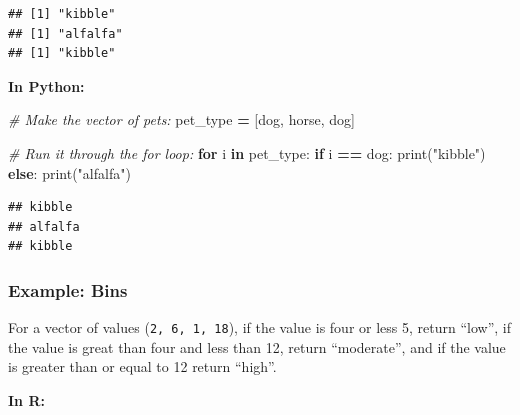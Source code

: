 \documentclass[
]{book}
\newenvironment{Shaded}{\begin{snugshade}}{\end{snugshade}}
\newcommand{\BuiltInTok}[1]{#1}
\newcommand{\CommentTok}[1]{\textcolor[rgb]{0.56,0.35,0.01}{\textit{#1}}}
\newcommand{\ControlFlowTok}[1]{\textcolor[rgb]{0.13,0.29,0.53}{\textbf{#1}}}
\newcommand{\KeywordTok}[1]{\textcolor[rgb]{0.13,0.29,0.53}{\textbf{#1}}}
\newcommand{\NormalTok}[1]{#1}
\newcommand{\OperatorTok}[1]{\textcolor[rgb]{0.81,0.36,0.00}{\textbf{#1}}}
\newcommand{\StringTok}[1]{\textcolor[rgb]{0.31,0.60,0.02}{#1}}
\begin{document}
\begin{verbatim}
## [1] "kibble"
## [1] "alfalfa"
## [1] "kibble"
\end{verbatim}

\textbf{In Python:}

\begin{Shaded}
\begin{Highlighting}[]
\CommentTok{\# Make the vector of pets:}
\NormalTok{pet\_type }\OperatorTok{=}\NormalTok{ [}\StringTok{\textquotesingle{}dog\textquotesingle{}}\NormalTok{, }\StringTok{\textquotesingle{}horse\textquotesingle{}}\NormalTok{, }\StringTok{\textquotesingle{}dog\textquotesingle{}}\NormalTok{]}

\CommentTok{\# Run it through the for loop: }
\ControlFlowTok{for}\NormalTok{ i }\KeywordTok{in}\NormalTok{ pet\_type:}
  \ControlFlowTok{if}\NormalTok{ i }\OperatorTok{==} \StringTok{\textquotesingle{}dog\textquotesingle{}}\NormalTok{:}
    \BuiltInTok{print}\NormalTok{(}\StringTok{"kibble"}\NormalTok{)}
  \ControlFlowTok{else}\NormalTok{:}
    \BuiltInTok{print}\NormalTok{(}\StringTok{"alfalfa"}\NormalTok{)}
\end{Highlighting}
\end{Shaded}

\begin{verbatim}
## kibble
## alfalfa
## kibble
\end{verbatim}

\hypertarget{example-bins}{%
\subsubsection{Example: Bins}\label{example-bins}}

For a vector of values (\texttt{2,\ 6,\ 1,\ 18}), if the value is four or less 5, return ``low'', if the value is great than four and less than 12, return ``moderate'', and if the value is greater than or equal to 12 return ``high''.

\textbf{In R:}
\end{document}
